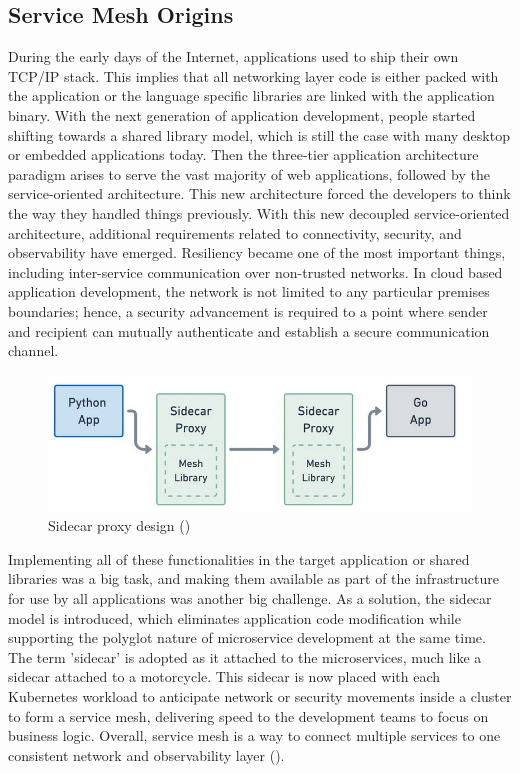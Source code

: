 \subsection{Service Mesh Origins}
During the early days of the Internet, applications used to ship their own TCP/IP stack. This implies that all networking layer code is either packed with the application or the language specific libraries are linked with the application binary. With the next generation of application development, people started shifting towards a shared library model, which is still the case with many desktop or embedded applications today. Then the three-tier application architecture paradigm arises to serve the vast majority of web applications, followed by the service-oriented architecture. This new architecture forced the developers to think the way they handled things previously. With this new decoupled service-oriented architecture, additional requirements related to connectivity, security, and observability have emerged. Resiliency became one of the most important things, including inter-service communication over non-trusted networks. In cloud based application development, the network is not limited to any particular premises boundaries; hence, a security advancement is required to a point where sender and recipient can mutually authenticate and establish a secure communication channel.

\begin{figure}[ht!]
  \centering
  \includegraphics[width=0.7\linewidth]{resources/sidecar-design.jpg}
  \caption{Sidecar proxy design (\cite{isovalentGraf2021})}
  \label{lr:sidecarDesign}
\end{figure}

Implementing all of these functionalities in the target application or shared libraries was a big task, and making them available as part of the infrastructure for use by all applications was another big challenge. As a solution, the sidecar model is introduced, which eliminates application code modification while supporting the polyglot nature of microservice development at the same time. The term 'sidecar' is adopted as it attached to the microservices, much like a sidecar attached to a motorcycle. This sidecar is now placed with each Kubernetes workload to anticipate network or security movements inside a cluster to form a service mesh, delivering speed to the development teams to focus on business logic. Overall, service mesh is a way to connect multiple services to one consistent network and observability layer (\cite{posedioNeumer2021}).


